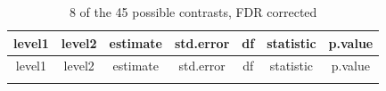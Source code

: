 \documentclass[]{article}
\theoremstyle{definition}
\theoremstyle{definition}
\theoremstyle{definition}
\theoremstyle{remark}
\begin{document}
\begin{longtable}[]{@{}ccccccc@{}}
\caption{8 of the 45 possible contrasts, FDR corrected}\tabularnewline
\toprule
\begin{minipage}[b]{0.16\columnwidth}\centering\strut
level1\strut
\end{minipage} & \begin{minipage}[b]{0.16\columnwidth}\centering\strut
level2\strut
\end{minipage} & \begin{minipage}[b]{0.10\columnwidth}\centering\strut
estimate\strut
\end{minipage} & \begin{minipage}[b]{0.11\columnwidth}\centering\strut
std.error\strut
\end{minipage} & \begin{minipage}[b]{0.05\columnwidth}\centering\strut
df\strut
\end{minipage} & \begin{minipage}[b]{0.11\columnwidth}\centering\strut
statistic\strut
\end{minipage} & \begin{minipage}[b]{0.11\columnwidth}\centering\strut
p.value\strut
\end{minipage}\tabularnewline
\midrule
\endfirsthead
\toprule
\begin{minipage}[b]{0.16\columnwidth}\centering\strut
level1\strut
\end{minipage} & \begin{minipage}[b]{0.16\columnwidth}\centering\strut
level2\strut
\end{minipage} & \begin{minipage}[b]{0.10\columnwidth}\centering\strut
estimate\strut
\end{minipage} & \begin{minipage}[b]{0.11\columnwidth}\centering\strut
std.error\strut
\end{minipage} & \begin{minipage}[b]{0.05\columnwidth}\centering\strut
df\strut
\end{minipage} & \begin{minipage}[b]{0.11\columnwidth}\centering\strut
statistic\strut
\end{minipage} & \begin{minipage}[b]{0.11\columnwidth}\centering\strut
p.value\strut
\end{minipage}\tabularnewline
\midrule
\endhead
\begin{minipage}[t]{0.16\columnwidth}\centering\strut

\end{minipage}
\end{longtable}
\end{document}
